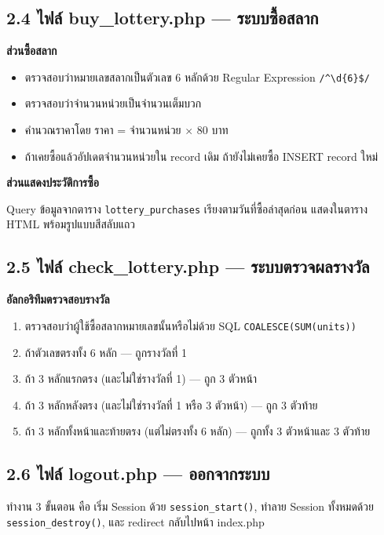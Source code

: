 \documentclass[a4paper,12pt]{article}
\begin{document}
\subsection*{2.4 ไฟล์ buy\_lottery.php --- ระบบซื้อสลาก}

\noindent\textbf{ส่วนซื้อสลาก}
\begin{itemize}[leftmargin=1.5cm, topsep=2pt, itemsep=1pt]
  \item ตรวจสอบว่าหมายเลขสลากเป็นตัวเลข 6 หลักด้วย Regular Expression \texttt{/\^{}\textbackslash{}d\{6\}\$/}
  \item ตรวจสอบว่าจำนวนหน่วยเป็นจำนวนเต็มบวก
  \item คำนวณราคาโดย ราคา = จำนวนหน่วย $\times$ 80 บาท
  \item ถ้าเคยซื้อแล้วอัปเดตจำนวนหน่วยใน record เดิม ถ้ายังไม่เคยซื้อ INSERT record ใหม่
\end{itemize}

\noindent\textbf{ส่วนแสดงประวัติการซื้อ}

Query ข้อมูลจากตาราง \texttt{lottery\_purchases} เรียงตามวันที่ซื้อล่าสุดก่อน แสดงในตาราง HTML พร้อมรูปแบบสีสลับแถว

\subsection*{2.5 ไฟล์ check\_lottery.php --- ระบบตรวจผลรางวัล}

\noindent\textbf{อัลกอริทึมตรวจสอบรางวัล}
\begin{enumerate}[leftmargin=2cm, label=\arabic*., topsep=2pt, itemsep=1pt]
  \item ตรวจสอบว่าผู้ใช้ซื้อสลากหมายเลขนั้นหรือไม่ด้วย SQL \texttt{COALESCE(SUM(units))}
  \item ถ้าตัวเลขตรงทั้ง 6 หลัก --- ถูกรางวัลที่ 1
  \item ถ้า 3 หลักแรกตรง (และไม่ใช่รางวัลที่ 1) --- ถูก 3 ตัวหน้า
  \item ถ้า 3 หลักหลังตรง (และไม่ใช่รางวัลที่ 1 หรือ 3 ตัวหน้า) --- ถูก 3 ตัวท้าย
  \item ถ้า 3 หลักทั้งหน้าและท้ายตรง (แต่ไม่ตรงทั้ง 6 หลัก) --- ถูกทั้ง 3 ตัวหน้าและ 3 ตัวท้าย
\end{enumerate}

\subsection*{2.6 ไฟล์ logout.php --- ออกจากระบบ}

ทำงาน 3 ขั้นตอน คือ เริ่ม Session ด้วย \texttt{session\_start()}, ทำลาย Session ทั้งหมดด้วย \texttt{session\_destroy()}, และ redirect กลับไปหน้า index.php
\end{document}
